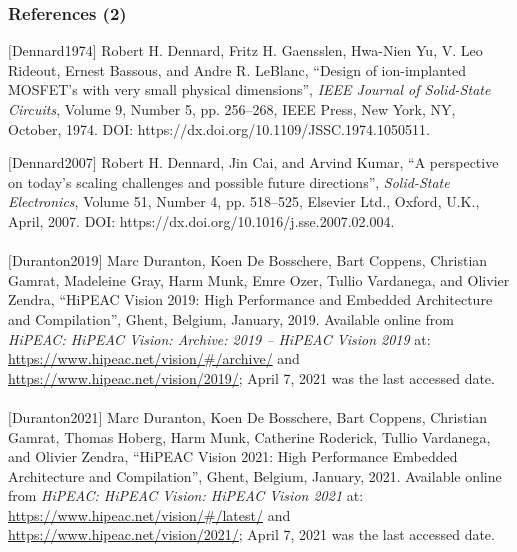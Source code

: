 \documentclass[xcolor={usenames,dvipsnames},hyperref={hyperindex,bookmarks}]{beamer}
\begin{document}
\begin{frame}
	\frametitle{References (2)}

	$[$Dennard1974$]$ Robert H. Dennard, Fritz H. Gaensslen, Hwa-Nien Yu, V. Leo Rideout, Ernest Bassous, and Andre R. {LeBlanc}, ``Design of ion-implanted {MOSFET}'s with very small physical dimensions'', {\it {IEEE} Journal of Solid-State Circuits}, Volume 9, Number 5, pp. 256--268, {IEEE} Press, New York, {NY}, October, 1974. DOI: https://dx.doi.org/10.1109/JSSC.1974.1050511.

	$[$Dennard2007$]$ Robert H. Dennard, Jin Cai, and Arvind Kumar, ``A perspective on today's scaling challenges and possible future directions'', {\it Solid-State Electronics}, Volume 51, Number 4, pp. 518--525, Elsevier Ltd., Oxford, {U.K.}, April, 2007. DOI: https://dx.doi.org/10.1016/j.sse.2007.02.004. \\
	\ \\
	$[$Duranton2019$]$ Marc Duranton, Koen {De Bosschere}, Bart Coppens, Christian Gamrat, Madeleine Gray, Harm Munk, Emre Ozer, Tullio Vardanega, and Olivier Zendra, ``{HiPEAC} Vision 2019: High Performance and Embedded Architecture and Compilation'', Ghent, Belgium, January, 2019. Available online from {\it {HiPEAC}: {HiPEAC} Vision: Archive: 2019 -- {HiPEAC} Vision 2019} at: \url{https://www.hipeac.net/vision/#/archive/} and \url{https://www.hipeac.net/vision/2019/}; April 7, 2021 was the last accessed date. \\
	\ \\
	$[$Duranton2021$]$ Marc Duranton, Koen {De Bosschere}, Bart Coppens, Christian Gamrat, Thomas Hoberg, Harm Munk, Catherine Roderick, Tullio Vardanega, and Olivier Zendra, ``{HiPEAC} Vision 2021: High Performance Embedded Architecture and Compilation'', Ghent, Belgium, January, 2021. Available online from {\it {HiPEAC}: {HiPEAC} Vision: {HiPEAC} Vision 2021} at: \url{https://www.hipeac.net/vision/#/latest/} and \url{https://www.hipeac.net/vision/2021/}; April 7, 2021 was the last accessed date.

\end{frame}
\end{document}
